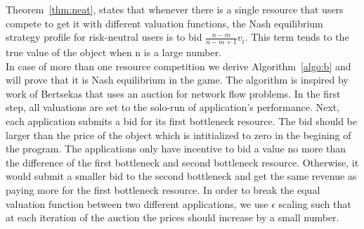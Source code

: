 \indent Theorem~\ref{thm:neat}, states that whenever there is a single resource that users compete to get it with different valuation functions, the Nash equilibrium strategy profile for risk-neutral users is to bid $\frac{n-m}{n-m+1}v_i$. This term tends to the true value of the object when n is a large number. \\
\indent In case of more than one resource competition we derive Algorithm~\ref{algo:b} and will prove that it is Nash equilibrium in the game. The algorithm is inspired by work of Bertsekas \cite{bertsekas1998network} that uses an auction for network flow problems. In the first step, all valuations are set to the solo-run of application's performance. Next, each application submits a bid for its first bottleneck resource. The bid should be larger than the price of the object which is intitialized to zero in the begining of the program. The applications only have incentive to bid a value no more than the difference of the first bottleneck and second bottleneck resource. Otherwise, it would submit a smaller bid to the second bottleneck and get the same revenue as paying more for the first bottleneck resource. In order to break the equal valuation function between two different applications, we use $\epsilon$ scaling such that at each iteration of the auction the prices should increase by a small number. 



